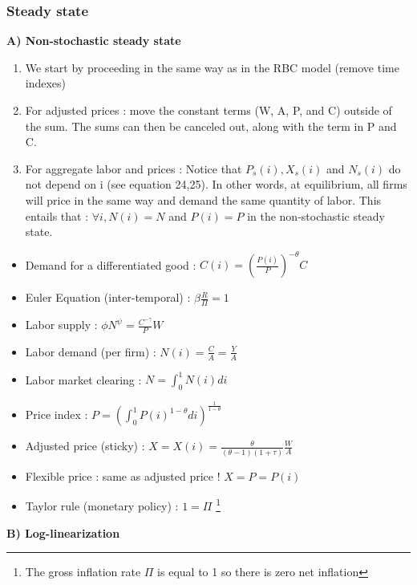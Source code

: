 \documentclass{article}
\begin{document}
\subsubsection{Steady state}
\textbf{A) Non-stochastic steady state}
\begin{enumerate}
    \item We start by proceeding in the same way as in the RBC model (remove time indexes)
    \item For adjusted prices : move the constant terms (W, A, P, and C) outside of the sum. The sums can then be canceled out, along with the term in P and C. 
    \item For aggregate labor and prices : Notice that $P_s(i), X_s(i)$ and $N_s(i)$ do not depend on i (see equation 24,25). In other words, at equilibrium, all firms will price in the same way and demand the same quantity of labor. This entails that : $\forall i, N(i) = N$ and $P(i)=P$ in the non-stochastic steady state.
\end{enumerate}
\begin{steadystatebox}
    \begin{itemize}
        \item Demand for a differentiated good : $C(i) = (\frac{P(i)}{P})^{-\theta}C$
        \item Euler Equation (inter-temporal) : $\beta \frac{R}{\Pi}=1$
        \item Labor supply : $\phi N^{\psi} = \frac{C^{-\gamma}}{P}W$
        \item Labor demand (per firm) : $N(i) = \frac{C}{A} = \frac{Y}{A}$
        \item Labor market clearing : $N=\int_0^1N(i)di$
        \item Price index : $P = (\int_0^1P(i)^{1-\theta}di)^{\frac{1}{1-\theta}}$
        \item Adjusted price (sticky) : $X = X(i) = \frac{\theta}{(\theta-1)(1+\tau)}\frac{W}{A}$
        \item Flexible price : same as adjusted price ! $X=P=P(i)$
        \item Taylor rule (monetary policy) : $1=\Pi$ \footnote{The gross inflation rate $\Pi$ is equal to 1 so there is zero net inflation}
    \end{itemize}
\end{steadystatebox}
\textbf{B) Log-linearization}
\end{document}
